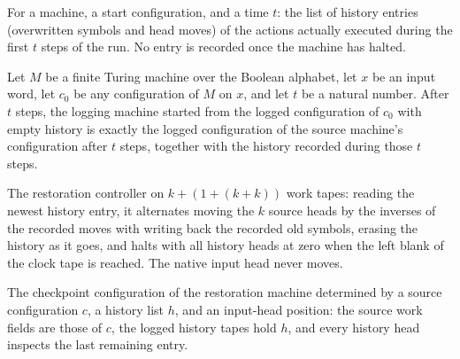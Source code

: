 \begin{definition}
\label{Complexity.enumCont_history}
\leanok
{}
For a machine, a start configuration, and a time $t$: the list of history entries
(overwritten symbols and head moves) of the actions actually executed during the
first $t$ steps of the run. No entry is recorded once the machine has halted.
\end{definition}

\begin{lemma}
\label{Complexity.enumCont_log_run}
\leanok
{}
Let $M$ be a finite Turing machine over the Boolean alphabet, let $x$ be an input word,
let $c_0$ be any configuration of $M$ on $x$, and let $t$ be a natural number. After $t$
steps, the logging machine started from the logged configuration of $c_0$ with empty
history is exactly the logged configuration of the source machine's configuration after
$t$ steps, together with the history recorded during those $t$ steps.
\end{lemma}

\begin{definition}
\label{Complexity.enumCont_undoTM}
\leanok
{}
The restoration controller on $k + (1 + (k + k))$ work tapes: reading the newest
history entry, it alternates moving the $k$ source heads by the inverses of the
recorded moves with writing back the recorded old symbols, erasing the history as
it goes, and halts with all history heads at zero when the left blank of the
clock tape is reached. The native input head never moves.
\end{definition}

\begin{definition}
\label{Complexity.enumCont_undoCfg}
\leanok
{}
The checkpoint configuration of the restoration machine determined by a source
configuration $c$, a history list $h$, and an input-head position: the source
work fields are those of $c$, the logged history tapes hold $h$, and every
history head inspects the last remaining entry.
\end{definition}

